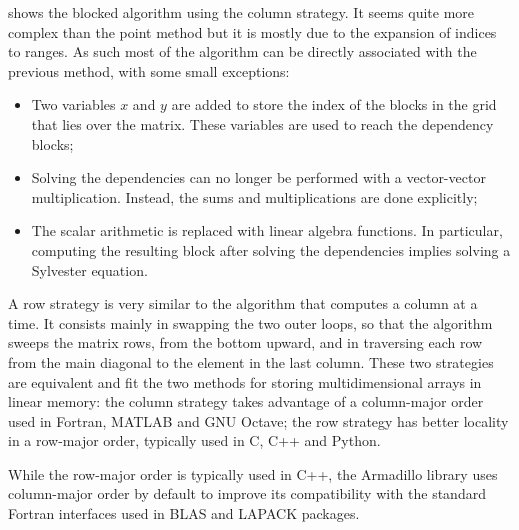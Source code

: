 \documentclass[../thesis]{subfiles}
\begin{document}
	 shows the blocked algorithm using the column strategy. It seems quite more complex than the point method but it is mostly due to the expansion of indices to ranges. As such most of the algorithm can be directly associated with the previous method, with some small exceptions:
	\begin{itemize}
		\item Two variables $x$ and $y$ are added to store the index of the blocks in the grid that lies over the matrix. These variables are used to reach the dependency blocks;
		\item Solving the dependencies can no longer be performed with a vector-vector multiplication. Instead, the sums and multiplications are done explicitly;
		\item The scalar arithmetic is replaced with linear algebra functions. In particular, computing the resulting block after solving the dependencies implies solving a Sylvester equation.
	\end{itemize}

	A row strategy is very similar to the algorithm that computes a column at a time. It consists mainly in swapping the two outer loops, so that the algorithm sweeps the matrix rows, from the bottom upward, and in traversing each row from the main diagonal to the element in the last column. These two strategies are equivalent and fit the two methods for storing multidimensional arrays in linear memory: the column strategy takes advantage of a column-major order used in Fortran, MATLAB and GNU Octave; the row strategy has better locality in a row-major order, typically used in C, C++ and Python.

	While the row-major order is typically used in C++, the Armadillo library uses column-major order by default to improve its compatibility with the standard Fortran interfaces used in BLAS and LAPACK packages.

	
	
\end{document}

